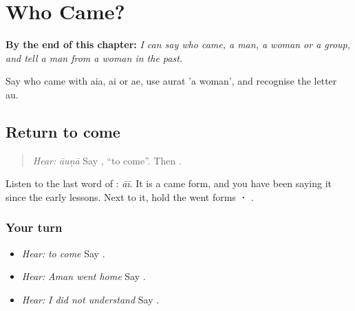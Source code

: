 
\chapter{Who Came?}
\label{ch:pa-a2-aaia}

\begin{chapteropening}
\textbf{By the end of this chapter:} \emph{I can say who came, a man, a woman or a group, and tell a man from a woman in the past.}

Say who came with aia, ai or ae, use aurat 'a woman', and recognise the letter au.
\end{chapteropening}

\section[\texorpdfstring{\pa{ਆਉਣਾ} · \pa{ਮੈਨੂੰ} \pa{ਸਮਝ} … (āuṇā · mainūṁ …)}{ਆਉਣਾ · ਮੈਨੂੰ ਸਮਝ … (āuṇā · mainūṁ …)}]{Return to come}

\label{lesson:PA-C217-came-return}



\begin{quote}
\emph{Hear:} \emph{āuṇā} Say \textbf{}, \textquotedblleft{}to come\textquotedblright{}. Then \textbf{   }.
\end{quote}

\begin{grammarlens}[title={Grammar Lens}]
Listen to the last word of \textbf{   }: \emph{āī}. It is a came form, and you have been saying it since the early lessons. Next to it, hold the went forms \textbf{ · }.
\end{grammarlens}

\subsection*{Your turn}
\begin{itemize}
\raggedright
  \item \emph{Hear:} \emph{to come} Say \textbf{}.
  \item \emph{Hear:} \emph{Aman went home} Say \textbf{  }.
  \item \emph{Hear:} \emph{I did not understand} Say \textbf{   }.
\end{itemize}

